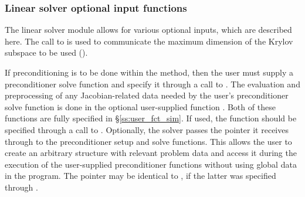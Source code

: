 \subsubsection{Linear solver optional input functions}
The {\kinspgmr} linear solver module allows for various optional 
inputs, which are described here.
The call to  is used to communicate the maximum dimension of the
Krylov subspace to be used (). 

If preconditioning is to be done within the {\spgmr} method,
then the user must supply a preconditioner solve function 
and specify it through a call to .
The evaluation and preprocessing of any Jacobian-related data needed
by the user's preconditioner solve function is done in the optional
user-supplied function . Both of these functions are
fully specified in \S\ref{ss:user_fct_sim}.
If used, the  function should be specified through a call to
.
Optionally, the {\kinspgmr} solver passes the pointer it receives through 
 to the preconditioner setup and solve functions.  
This allows the user to create an arbitrary structure with relevant problem data 
and access it during the execution of the user-supplied preconditioner functions
without using global data in the program.  
The pointer  may be identical to , if the latter was 
specified through .

